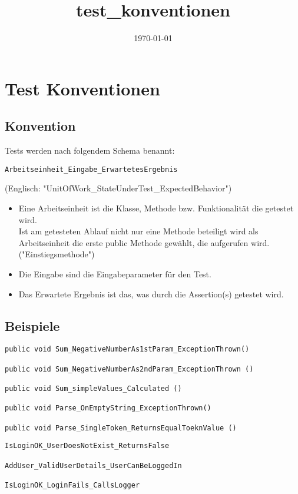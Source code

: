 \documentclass[11pt]{article}
\date{\today}
\title{test\_konventionen}
\begin{document}
\maketitle
\tableofcontents


\section{Test Konventionen}
\label{sec-1}

\subsection{Konvention}
\label{sec-1-1}
Tests werden nach folgendem Schema benannt:
\begin{verbatim}
Arbeitseinheit_Eingabe_ErwartetesErgebnis
\end{verbatim}
(Englisch: "UnitOfWork\_StateUnderTest\_ExpectedBehavior")

\begin{itemize}
\item Eine Arbeitseinheit ist die Klasse, Methode bzw. Funktionalität die getestet wird. \\
    Ist am getesteten Ablauf nicht nur eine Methode beteiligt wird als \\
    Arbeitseinheit die erste public Methode gewählt, die aufgerufen wird. ("Einstiegsmethode")
\item Die Eingabe sind die Eingabeparameter für den Test.
\item Das Erwartete Ergebnis ist das, was durch die Assertion(s) getestet wird.
\end{itemize}

\subsection{Beispiele}
\label{sec-1-2}

\begin{verbatim}
public void Sum_NegativeNumberAs1stParam_ExceptionThrown()

public void Sum_NegativeNumberAs2ndParam_ExceptionThrown ()

public void Sum_simpleValues_Calculated ()

public void Parse_OnEmptyString_ExceptionThrown()

public void Parse_SingleToken_ReturnsEqualToeknValue ()
\end{verbatim}

\begin{verbatim}
IsLoginOK_UserDoesNotExist_ReturnsFalse

AddUser_ValidUserDetails_UserCanBeLoggedIn

IsLoginOK_LoginFails_CallsLogger
\end{verbatim}
\end{document}
